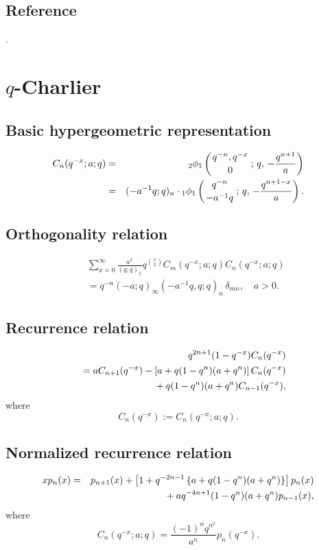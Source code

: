 \documentclass[envcountchap,graybox]{svmono}
\newcommand{\qhyp}[5]{\mbox{}_{#1}{\phi}_{#2}
\left(\genfrac{}{}{0pt}{}{#3}{#4}\,;\,q,\,#5\right)}
\newcommand{\mathindent}{\hspace{7.5mm}}
\newcommand{\qhyp}[5]{\,\mbox{}_{#1}\phi_{#2}\!\left(
  \genfrac{}{}{0pt}{}{#3}{#4};#5\right)}
\begin{document}
{{\subsection*{Reference}
\cite{DattaGriffin}.


\section{$q$-Charlier}
\par\setcounter{equation}{0}

\subsection*{Basic hypergeometric representation}
\begin{eqnarray}
\label{DefqCharlier}
C_n(q^{-x};a;q)&=&\qhyp{2}{1}{q^{-n},q^{-x}}{0}{-\frac{q^{n+1}}{a}}\\
&=&(-a^{-1}q;q)_n\cdot\qhyp{1}{1}{q^{-n}}{-a^{-1}q}{-\frac{q^{n+1-x}}{a}}.\nonumber
\end{eqnarray}

\subsection*{Orthogonality relation}
\begin{eqnarray}
\label{OrtqCharlier}
& &\sum_{x=0}^{\infty}\frac{a^x}{(q;q)_x}q^{\binom{x}{2}}C_m(q^{-x};a;q)C_n(q^{-x};a;q)\nonumber\\
& &{}=q^{-n}(-a;q)_{\infty}(-a^{-1}q,q;q)_n\,\delta_{mn},\quad a>0.
\end{eqnarray}

\newpage

\subsection*{Recurrence relation}
\begin{eqnarray}
\label{RecqCharlier}
& &q^{2n+1}(1-q^{-x})C_n(q^{-x})\nonumber\\
& &{}=aC_{n+1}(q^{-x})-\left[a+q(1-q^n)(a+q^n)\right]C_n(q^{-x})\nonumber\\
& &{}\mathindent{}+q(1-q^n)(a+q^n)C_{n-1}(q^{-x}),
\end{eqnarray}
where
$$C_n(q^{-x}):=C_n(q^{-x};a;q).$$

\subsection*{Normalized recurrence relation}
\begin{eqnarray}
\label{NormRecqCharlier}
xp_n(x)&=&p_{n+1}(x)+\left[1+q^{-2n-1}\left\{a+q(1-q^n)(a+q^n)\right\}\right]p_n(x)\nonumber\\
& &{}\mathindent{}+aq^{-4n+1}(1-q^n)(a+q^n)p_{n-1}(x),
\end{eqnarray}
where
$$C_n(q^{-x};a;q)=\frac{(-1)^nq^{n^2}}{a^n}p_n(q^{-x}).$$

}}
\end{document}
